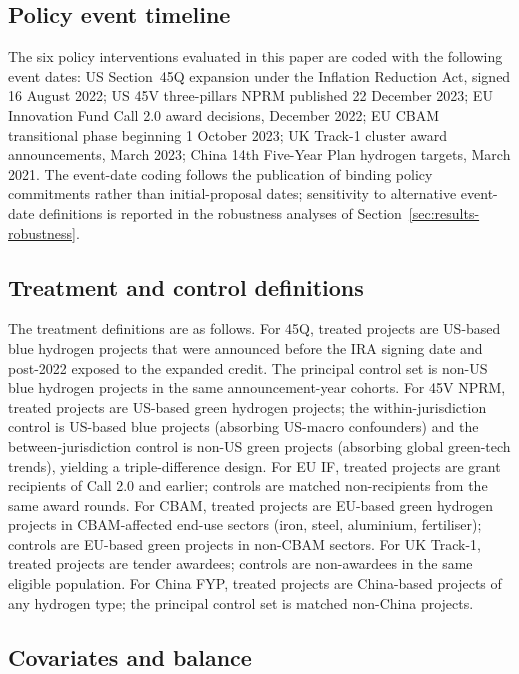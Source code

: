 \documentclass[12pt,a4paper]{article}
\theoremstyle{plain}
\theoremstyle{definition}
\begin{document}
\subsection{Policy event timeline}
\label{sec:data-policy}

The six policy interventions evaluated in this paper are coded with the following event dates: US Section~45Q expansion under the Inflation Reduction Act, signed 16 August 2022; US 45V three-pillars NPRM published 22 December 2023; EU Innovation Fund Call 2.0 award decisions, December 2022; EU CBAM transitional phase beginning 1 October 2023; UK Track-1 cluster award announcements, March 2023; China 14th Five-Year Plan hydrogen targets, March 2021. The event-date coding follows the publication of binding policy commitments rather than initial-proposal dates; sensitivity to alternative event-date definitions is reported in the robustness analyses of Section~\ref{sec:results-robustness}.

\subsection{Treatment and control definitions}
\label{sec:data-treatment}

The treatment definitions are as follows. For 45Q, treated projects are US-based blue hydrogen projects that were announced before the IRA signing date and post-2022 exposed to the expanded credit. The principal control set is non-US blue hydrogen projects in the same announcement-year cohorts. For 45V NPRM, treated projects are US-based green hydrogen projects; the within-jurisdiction control is US-based blue projects (absorbing US-macro confounders) and the between-jurisdiction control is non-US green projects (absorbing global green-tech trends), yielding a triple-difference design. For EU IF, treated projects are grant recipients of Call 2.0 and earlier; controls are matched non-recipients from the same award rounds. For CBAM, treated projects are EU-based green hydrogen projects in CBAM-affected end-use sectors (iron, steel, aluminium, fertiliser); controls are EU-based green projects in non-CBAM sectors. For UK Track-1, treated projects are tender awardees; controls are non-awardees in the same eligible population. For China FYP, treated projects are China-based projects of any hydrogen type; the principal control set is matched non-China projects.

\subsection{Covariates and balance}
\label{sec:data-covariates}
\end{document}
